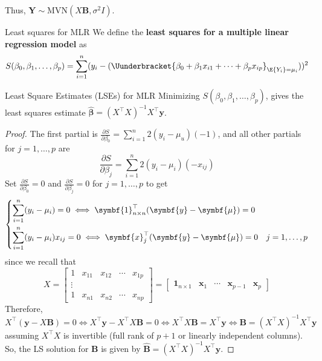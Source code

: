 Thus, $ \symbf{Y}\sim \text{MVN}(X\symbf{B},\sigma^2 I) $.
\begin{Definition}{Least squares for MLR}{}
    We define the \textbf{least squares for a multiple linear regression model}
    as
    \[ S(\beta_0,\beta_1,\ldots,\beta_p)
        =\sum\limits_{i=1}^{n}
        (y_i-(\Uunderbracket{
            \beta_0+\beta_1 x_{i1}+\cdots+\beta_p x_{ip}
        }_{\E{Y_i}=\mu_i}))^2
    \]
\end{Definition}
\begin{Theorem}{Least Square Estimates (LSEs) for MLR}{}
    Minimizing $ S(\beta_0,\beta_1,\ldots,\beta_p) $, gives the least squares
    estimate $ \hat{\symbf{\beta}}=(X^\top X)^{-1}X^\top\symbf{y} $.
\end{Theorem}
\begin{proof}
    The first partial is $ \frac{\partial S}{\partial \beta_0}=\sum\limits_{i=1}^{n} 2(y_i-\mu_u)(-1) $,
    and all other partials for $ j=1,\ldots,p $ are
    \[ \dfrac{\partial S}{\partial \beta_j}=
        \sum\limits_{i=1}^{n} 2(y_i-\mu_i)(-x_{ij}) \]
    Set $ \displaystyle \frac{\partial S}{\partial \beta_0}=0 $
    and $ \displaystyle \frac{\partial S}{\partial \beta_j}=0 $ for $ j=1,\ldots,p $
    to get
    \[ \begin{dcases}
            \sum\limits_{i=1}^{n} (y_i-\mu_i)=0\iff \symbf{1}_{n\times n}^\top(\symbf{y}-\symbf{\mu})=0 \\
            \sum\limits_{i=1}^{n} (y_i-\mu_i)x_{ij}=0\iff \symbf{x}_{j}^\top
            (\symbf{y}-\symbf{\mu})=0 & j=1,\ldots,p
        \end{dcases} \]
    since we recall that
    \[ X=\begin{bmatrix}
            1 & x_{11} & x_{12} & \cdots & x_{1p} \\
            \vdots                                \\
            1 & x_{n1} & x_{n2} & \cdots & x_{np}
        \end{bmatrix}=
        \begin{bmatrix}
            \symbf{1}_{n\times 1} & \symbf{x}_1 & \cdots & \symbf{x}_{p-1} & \symbf{x}_p
        \end{bmatrix} \]
    Therefore,
    \[ X^\top(\symbf{y}-X\symbf{B})=0\iff
        X^\top \symbf{y}-X^\top X\symbf{B}=0\iff
        X^\top X \symbf{B}=X^\top \symbf{y}\iff
        \symbf{B}=(X^\top X)^{-1}X^\top \symbf{y} \]
    assuming $ X^\top X $ is invertible (full rank of $ p+1 $ or linearly
    independent columns). So, the LS solution for $ \symbf{B} $ is given by
    $ \hat{\symbf{B}}=(X^\top X)^{-1}X^\top \symbf{y} $.
\end{proof}
